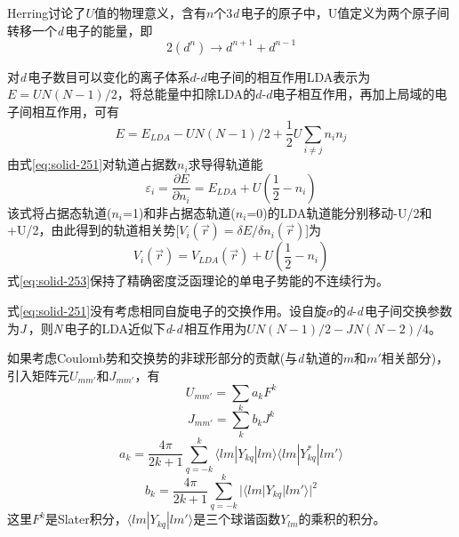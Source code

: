 Herring讨论了$U$值的物理意义\cite{Herring}，含有$n$个3{\it d}\,电子的原子中，U值定义为两个原子间转移一个{\it d}\,电子的能量，即$$2(d^n)\rightarrow d^{n+1}+d^{n-1}$$

对{\it d}\,电子数目可以变化的离子体系$d$-$d$电子间的相互作用LDA表示为$E=UN(N-1)/2$\cite{PRB48-16929_1993}，将总能量中扣除LDA的$d$-$d$电子相互作用，再加上局域的电子间相互作用，可有
\begin{equation}
  E=E_{LDA}-UN(N-1)/2+\frac12U\sum_{i\neq j}n_in_j
  \label{eq:solid-251}
\end{equation}
由式\eqref{eq:solid-251}对轨道占据数$n_i$求导得轨道能
\begin{equation}
  \varepsilon_i=\frac{\partial E}{\partial n_i}=E_{LDA}+U(\frac12-n_i)
  \label{eq:solid-252}
\end{equation}
该式将占据态轨道($n_i$=1)和非占据态轨道($n_i$=0)的LDA轨道能分别移动-U/2和+U/2，由此得到的轨道相关势[$V_i(\vec r)=\delta E/\delta n_i(\vec r)$]为
\begin{equation}
  V_i(\vec r)=V_{LDA}(\vec r)+U(\frac12-n_i)
  \label{eq:solid-253}
\end{equation}
式\eqref{eq:solid-253}保持了精确密度泛函理论的单电子势能的不连续行为。

式\eqref{eq:solid-251}没有考虑相同自旋电子的交换作用。设自旋$\sigma$的{\it d}-{\it d}\,电子间交换参数为{\it J}\,，则{\it N}\,电子的LDA近似下{\it d}-{\it d}\,相互作用为$UN(N-1)/2-JN(N-2)/4$。

如果考虑Coulomb势和交换势的非球形部分的贡献(与{\it d}\,轨道的$m$和$m'$相关部分)，引入矩阵元$U_{mm'}$和$J_{mm'}$，有
\begin{equation}
  U_{mm'}=\sum_ka_kF^k
  \label{eq:solid-210}
\end{equation}
\begin{equation}
  J_{mm'}=\sum_kb_kJ^k
  \label{eq:solid-211}
\end{equation}
\begin{equation}
  a_k=\frac{4\pi}{2k+1}\sum_{q=-k}^k\langle lm|Y_{kq}|lm\rangle\langle lm|Y_{kq}^{\ast}|lm'\rangle
  \label{eq:solid-212}
\end{equation}
\begin{equation}
  b_k=\frac{4\pi}{2k+1}\sum_{q=-k}^k|\langle lm|Y_{kq}|lm'\rangle|^2
  \label{eq:solid-213}
\end{equation}
这里$F^k$是Slater积分，$\langle lm|Y_{kq}|lm'\rangle$是三个球谐函数$Y_{lm}$的乘积的积分。

